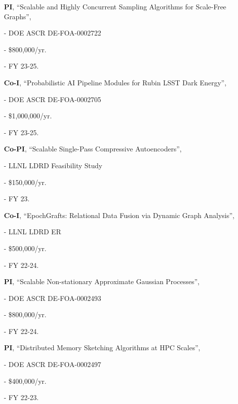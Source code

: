 \begin{innerlist}
  \item[] \textbf{PI},
  ``Scalable and Highly Concurrent Sampling Algorithms for Scale-Free Graphs'',
  \begin{innerlist}
    \item[-] DOE ASCR DE-FOA-0002722
    \item[-] \$800,000/yr.
    \item[-] FY 23-25.
  \end{innerlist}

  \item[] \textbf{Co-I},
  ``Probabilistic AI Pipeline Modules for Rubin LSST Dark Energy'',
  \begin{innerlist}
    \item[-] DOE ASCR DE-FOA-0002705
    \item[-] \$1,000,000/yr.
    \item[-] FY 23-25.
  \end{innerlist}

  \item[] \textbf{Co-PI},
  ``Scalable Single-Pass Compressive Autoencoders'',
  \begin{innerlist}
    \item[-] LLNL LDRD Feasibility Study
    \item[-] \$150,000/yr.
    \item[-] FY 23.
  \end{innerlist}

  \item[] \textbf{Co-I},
  ``EpochGrafts: Relational Data Fusion via Dynamic Graph Analysis'',
  \begin{innerlist}
    \item[-] LLNL LDRD ER
    \item[-] \$500,000/yr.
    \item[-] FY 22-24.
  \end{innerlist}

  \item[] \textbf{PI},
  ``Scalable Non-stationary Approximate Gaussian Processes'',
  \begin{innerlist}
    \item[-] DOE ASCR DE-FOA-0002493
    \item[-] \$800,000/yr.
    \item[-] FY 22-24.
  \end{innerlist}

  \item[] \textbf{PI},
  ``Distributed Memory Sketching Algorithms at HPC Scales'',
  \begin{innerlist}
    \item[-] DOE ASCR DE-FOA-0002497
    \item[-] \$400,000/yr.
    \item[-] FY 22-23.
  \end{innerlist}


\end{innerlist}
